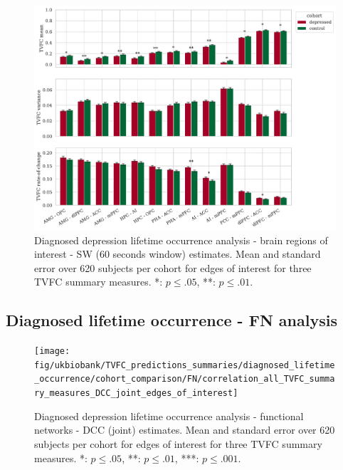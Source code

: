 \begin{figure}[h]
    \centering
    \includegraphics[width=\textwidth]{fig/ukbiobank/TVFC_predictions_summaries/diagnosed_lifetime_occurrence/cohort_comparison/ROI/correlation_all_TVFC_summary_measures_SW_60_edges_of_interest}
    \caption{
        Diagnosed depression lifetime occurrence analysis - brain regions of interest - SW (60 seconds window) estimates.
        Mean and standard error over 620 subjects per cohort for edges of interest for three TVFC summary measures.
        *: $p \leq .05$, **: $p \leq .01$.
    }\label{fig:ukb-results-dlo-roi-cohort-comparison-edges-of-interest-sw-60}
\end{figure}


\clearpage
\subsection{Diagnosed lifetime occurrence - FN analysis}


\begin{figure}[h]
  \centering
  \texttt{[image: fig/ukbiobank/TVFC\_predictions\_summaries/diagnosed\_lifetime\_occurrence/cohort\_comparison/FN/correlation\_all\_TVFC\_summary\_measures\_DCC\_joint\_edges\_of\_interest]}
  \caption{
    Diagnosed depression lifetime occurrence analysis - functional networks - DCC (joint) estimates.
    Mean and standard error over 620 subjects per cohort for edges of interest for three TVFC summary measures.
    *: $p \leq .05$, **: $p \leq .01$, ***: $p \leq .001$.
  }\label{fig:ukb-results-dlo-fn-cohort-comparison-edges-of-interest-dcc-j}
\end{figure}


